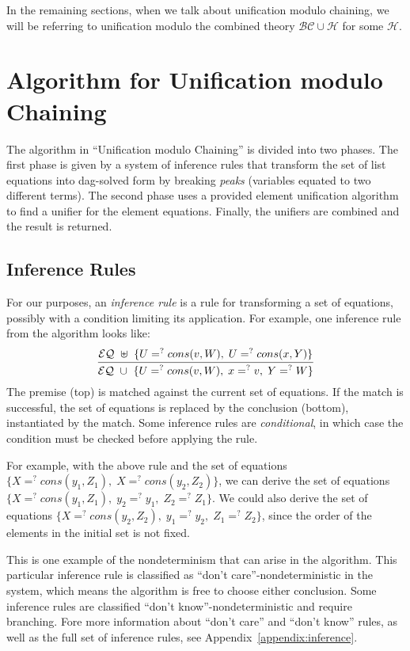 \documentclass[11pt]{article}
\newcommand{\ueq}{=_{}^?}
\newcommand{\BC}{\mathcal{BC}}
\newcommand{\HH}{\mathcal{H}}
\newcommand{\EQ}{\mathcal{EQ}}
\begin{document}
In the remaining sections, when we talk about unification modulo chaining,
we will be referring to unification modulo the combined theory $\BC \cup \HH$
for some $\HH$.

\section{Algorithm for Unification modulo Chaining}\label{section:algorithm}

The algorithm in ``Unification modulo Chaining'' is divided into two phases.
The first phase is given by a system of inference rules that transform the
set of list equations into dag-solved form by breaking \emph{peaks} (variables
equated to two different terms). The second phase uses a provided
element unification algorithm to find a unifier for the element equations.
Finally, the unifiers are combined and the result is returned.

\subsection{Inference Rules}\label{subsection:inference}

For our purposes, an \emph{inference rule} is a rule for transforming a set of
equations, possibly with a condition limiting its application. For example, one
inference rule from the algorithm looks like:
\[\infer
    {\EQ ~ \cup ~ \{ U \ueq cons(v, W), \; x \ueq v, \; Y \ueq W \}}
    {\EQ ~ \uplus ~ \{ U \ueq cons(v, W), \; U \ueq cons(x, Y) \}}
\]
The premise (top) is matched against the current set of equations. If the match
is successful, the set of equations is replaced by the conclusion (bottom),
instantiated by the match. Some inference rules are \emph{conditional}, in
which case the condition must be checked before applying the rule.

For example, with the above rule and
the set of equations $\{ X \ueq cons(y_1, Z_1), \; X \ueq cons(y_2, Z_2) \}$,
we can derive the set of equations $\{ X \ueq cons(y_1, Z_1), \; y_2 \ueq y_1,
\; Z_2 \ueq Z_1 \}$. We could also derive the set of equations $\{ X \ueq
cons(y_2, Z_2), \; y_1 \ueq y_2, \; Z_1 \ueq Z_2 \}$, since the order of the
elements in the initial set is not fixed.

This is one example of the nondeterminism that can arise in the algorithm.
This particular inference rule is classified as ``don't care''-nondeterministic
in the system, which means the algorithm is free to choose either conclusion.
Some inference rules are classified ``don't know''-nondeterministic and require
branching. Fore more information about ``don't care'' and ``don't know'' rules,
as well as the full set of inference rules, see
Appendix~\ref{appendix:inference}.
\end{document}
